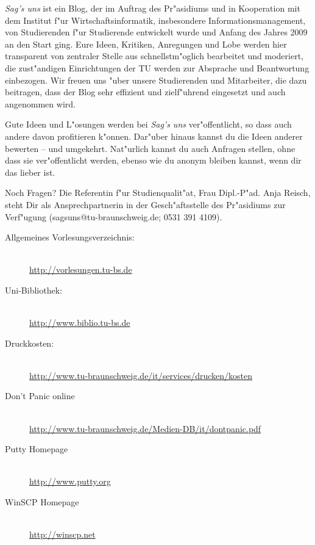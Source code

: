 \emph{Sag's uns} ist ein Blog, der im Auftrag des Pr"asidiums und in Kooperation mit dem Institut f"ur Wirtschaftsinformatik, insbesondere Informationsmanagement, von Studierenden f"ur Studierende entwickelt wurde und Anfang des Jahres 2009 an den Start ging.
Eure Ideen, Kritiken, Anregungen und Lobe werden hier transparent von zentraler Stelle aus schnellstm"oglich bearbeitet und moderiert, die zust"andigen Einrichtungen der TU werden zur Absprache und Beantwortung einbezogen. 
Wir freuen uns "uber unsere Studierenden und Mitarbeiter, die dazu beitragen, dass der Blog sehr effizient und zielf"uhrend eingesetzt und auch angenommen wird.

Gute Ideen und L"osungen werden bei \emph{Sag's uns} ver"offentlicht, so dass auch andere davon profitieren k"onnen.
Dar"uber hinaus kannst du die Ideen anderer bewerten – und umgekehrt. Nat"urlich kannst du auch Anfragen stellen, ohne dass sie ver"offentlicht werden, ebenso wie du anonym bleiben kannst, wenn dir das lieber ist.

Noch Fragen? Die Referentin f"ur Studienqualit"at, Frau Dipl.-P"ad. Anja Reisch, steht Dir als Ansprechpartnerin in der Gesch"aftsstelle des Pr"asidiums zur Verf"ugung (sagsuns@tu-braunschweig.de; 0531 391 4109).

\begin{description}
\item[Allgemeines Vorlesungsverzeichnis:] ~\\
{\footnotesize\url{http://vorlesungen.tu-bs.de}}
\item[Uni-Bibliothek:] ~\\
{\footnotesize\url{http://www.biblio.tu-bs.de}}
\item[Druckkosten:] ~\\
{\footnotesize\url{http://www.tu-braunschweig.de/it/services/drucken/kosten}}
\item[Don't Panic online] ~\\
{\footnotesize\url{http://www.tu-braunschweig.de/Medien-DB/it/dontpanic.pdf}}
\item[Putty Homepage] ~\\
{\footnotesize\url{http://www.putty.org}}
\item[WinSCP Homepage] ~\\
{\footnotesize\url{http://winscp.net}}
\end{description}
